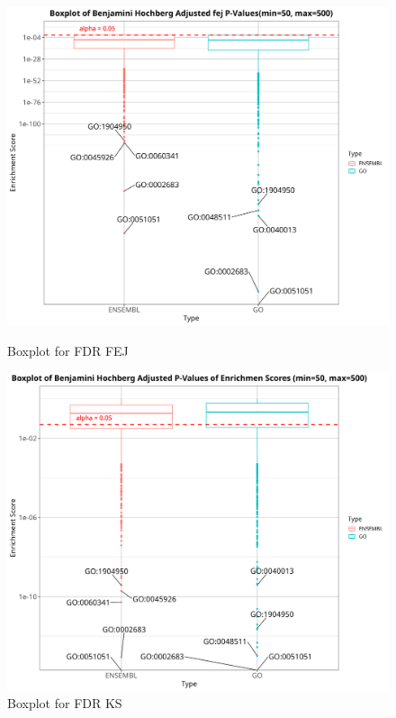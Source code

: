 \documentclass[12pt]{article}
\begin{document}
\begin{figure}[htpb]
    \centering
    \begin{minipage}{0.49\textwidth}
        \centering
        \includegraphics[width=\textwidth]{./plots/BHBoxplotFDRFEJ.png}
        \caption{Boxplot for FDR FEJ}
        \label{fig:boxplot-fdr-fej}
    \end{minipage}
    \hfill
    \begin{minipage}{0.49\textwidth}
        \centering
        \includegraphics[width=\textwidth]{./plots/BHBoxplotFDRKS.png}
        \caption{Boxplot for FDR KS}
        \label{fig:boxplot-fdr-ks}
    \end{minipage}
\end{figure}
\end{document}
